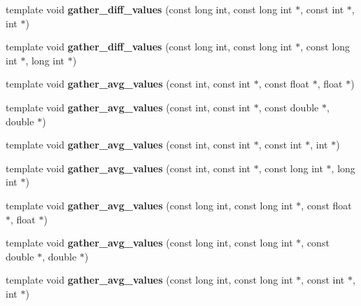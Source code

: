 \begin{DoxyCompactItemize}
\item 
\mbox{\label{namespaceschwz_abf11ae3dd34298145fa6c6be53e9c62d}} 
template void {\bfseries gather\+\_\+diff\+\_\+values} (const long int, const long int $\ast$, const int $\ast$, int $\ast$)
\item 
\mbox{\label{namespaceschwz_a6b906ed90cfe429146cb1e253fe06116}} 
template void {\bfseries gather\+\_\+diff\+\_\+values} (const long int, const long int $\ast$, const long int $\ast$, long int $\ast$)
\item 
\mbox{\label{namespaceschwz_afa5bc78e39b6982bf8f9b3d0687647c0}} 
template void {\bfseries gather\+\_\+avg\+\_\+values} (const int, const int $\ast$, const float $\ast$, float $\ast$)
\item 
\mbox{\label{namespaceschwz_a4a966e8da22076968cde59487e74e248}} 
template void {\bfseries gather\+\_\+avg\+\_\+values} (const int, const int $\ast$, const double $\ast$, double $\ast$)
\item 
\mbox{\label{namespaceschwz_a9ad25532a91580ee41f3f21a9ef6e1e6}} 
template void {\bfseries gather\+\_\+avg\+\_\+values} (const int, const int $\ast$, const int $\ast$, int $\ast$)
\item 
\mbox{\label{namespaceschwz_a598e57814eb4b4266415619c6e01ea8a}} 
template void {\bfseries gather\+\_\+avg\+\_\+values} (const int, const int $\ast$, const long int $\ast$, long int $\ast$)
\item 
\mbox{\label{namespaceschwz_a4c9e5b9195d16742a8e09ae8eb1b948d}} 
template void {\bfseries gather\+\_\+avg\+\_\+values} (const long int, const long int $\ast$, const float $\ast$, float $\ast$)
\item 
\mbox{\label{namespaceschwz_ad44f654032dc8868eeb4000d8953d87c}} 
template void {\bfseries gather\+\_\+avg\+\_\+values} (const long int, const long int $\ast$, const double $\ast$, double $\ast$)
\item 
\mbox{\label{namespaceschwz_a9209d8313c0da94428a5ebd8ab6d955f}} 
template void {\bfseries gather\+\_\+avg\+\_\+values} (const long int, const long int $\ast$, const int $\ast$, int $\ast$)

\end{DoxyCompactItemize}
